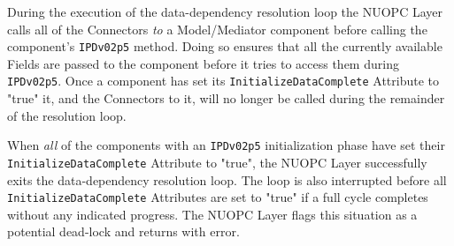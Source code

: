 During the execution of the data-dependency resolution loop the NUOPC Layer calls all of the Connectors {\em to} a Model/Mediator component before calling the component's {\tt IPDv02p5} method. Doing so ensures that all the currently available Fields are passed to the component before it tries to access them during {\tt IPDv02p5}. Once a component has set its {\tt InitializeDataComplete} Attribute to "true" it, and the Connectors to it, will no longer be called during the remainder of the resolution loop. 

When {\em all} of the components with an {\tt IPDv02p5} initialization phase have set their {\tt InitializeDataComplete} Attribute to "true", the NUOPC Layer successfully exits the data-dependency resolution loop. The loop is also interrupted before all {\tt InitializeDataComplete} Attributes are set to "true" if a full cycle completes without any indicated progress. The NUOPC Layer flags this situation as a potential dead-lock and returns with error.
